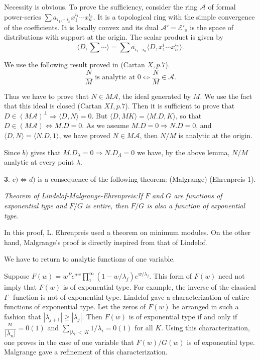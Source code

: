 Necessity is obvious. To prove the sufficiency, consider the ring
$\mathscr{A}$ of formal power-series $\sum a_{i_1, \cdots i_n }
x^{i_1}_1 \cdots x^{i_n}_n$. It is a topological ring with the simple
convergence of the coefficients. It is locally convex and its dual
$\mathscr{A}' = \mathscr{E}'_o$ is the space of distributions with
support at the origin. The scalar product is given by 
$$
\langle D, \sum \cdots \rangle = \sum a_{i_1 \cdots i_n} \langle D,
x^i_1 \cdots x^{i_n}_n \rangle. 
$$

We use the following result proved in (Cartan $X, p.7$).
$$
\frac{N}{M} \text{ is analytic at } 0 \Longleftrightarrow \frac{N}{M}
\in \mathscr{A}. 
$$

Thus we have to prove that $N \in M \mathscr{A}$, the ideal generated
by $M$. We use the fact that this ideal is closed (Cartan $XI,
p.7$). Then it is sufficient to prove that $D \in (M
\mathscr{A})^\perp \Rightarrow \langle D, N \rangle = 0$. But $\langle
D, MK \rangle = \langle M.D, K \rangle$, so that $D \in (M\mathscr{A})
\Longleftrightarrow M.D = 0$. As we assume $M.D = 0 \Rightarrow N.D =
0$, and $\langle D, N \rangle = \langle N.D, 1 \rangle$, we have
proved $N \in M \mathscr{A}$, then $N/M$ is analytic at the origin. 

Since $b)$ gives that $M.D_\lambda = 0 \Rightarrow N.D_\Lambda = 0$ we
have, by the above lemma, $N/M$ analytic at every point $\lambda$. 

\textbf{3}. $c) \Longleftrightarrow d)$ is a consequence of the
following theorem: (Malgrange) (Ehrenpreis $1$). 

\textit{Theorem of Lindelof-Malgrange-Ehrenpreis:\pageoriginale If $F$ and $G$
 are functions of exponential type and $F/G$ is entire, then $F/G$ is
 also a function of exponential type}. 

In this proof, L. Ehrenpreis used a theorem on minimum modules. On the
other hand, Malgrange's proof is directly inspired from that of
Lindelof. 

We have to return to analytic functions of one variable.

Suppose $F(w) = w^P e^{aw} \prod\limits_{1}^\infty (1-w/\lambda_j)
e^{w/\lambda_j}$. This form of $F(w)$ need not imply that $F(w)$ is
of exponential type. For example, the inverse of the classical
$\Gamma$- function is not of exponential type. Lindelof gave a
characterization of entire functions of exponential type. Let the
zeros of $F(w)$ be arranged in such a fashion that $|\lambda_{j+1} |
\ge | \lambda_j |$. Then $F(w)$ is of exponential type if and only if
$\dfrac{n}{| \lambda_n |} = 0(1)$ and $\sum\limits_{| \lambda_i | <
 |K} 1/\lambda_i = 0(1)$ for all $K$. Using this characterization,
one proves in the case of one variable that $F(w) / G(w)$ is of
exponential type. Malgrange gave a refinement of this
characterization. 

